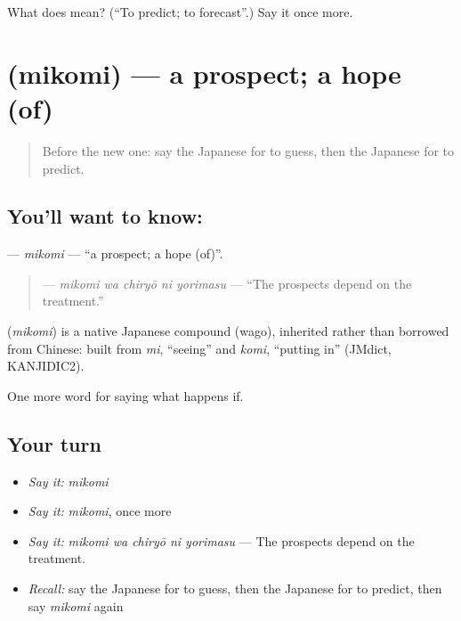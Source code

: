 \begin{tcolorbox}[breakable,colback=teal!4,colframe=teal!35!black,title={Before you move on}]
What does  mean? (\textquotedblleft{}To predict; to forecast\textquotedblright{}.) Say it once more.
\end{tcolorbox}
\section[\texorpdfstring{\ja{みこみ} (mikomi)}{みこみ (mikomi)}]{ (mikomi) — a prospect; a hope (of)}

\label{lesson:JA-C514-mikomi}



\begin{quote}
Before the new one: say the Japanese for to guess, then the Japanese for to predict.
\end{quote}

\subsection*{You'll want to know: }
\textbf{} — \emph{mikomi} — \textquotedblleft{}a prospect; a hope (of)\textquotedblright{}.

\begin{quote}
\textbf{  } — \emph{mikomi wa chiryō ni yorimasu} — \textquotedblleft{}The prospects depend on the treatment.\textquotedblright{}
\end{quote}

\begin{cousinweb}
\textbf{} (\emph{mikomi}) is a native Japanese compound (wago), inherited rather than borrowed from Chinese: built from \emph{mi}, \textquotedblleft{}seeing\textquotedblright{} and \emph{komi}, \textquotedblleft{}putting in\textquotedblright{} (JMdict, KANJIDIC2).
\end{cousinweb}

\begin{grammarlens}[title={What you've built}]
One more word for saying what happens if.
\end{grammarlens}

\subsection*{Your turn}
\begin{itemize}
\raggedright
  \item \emph{Say it:} \emph{mikomi}
  \item \emph{Say it:} \emph{mikomi}, once more
  \item \emph{Say it:} \emph{mikomi wa chiryō ni yorimasu} — The prospects depend on the treatment.
  \item \emph{Recall:} say the Japanese for to guess, then the Japanese for to predict, then say \emph{mikomi} again
\end{itemize}

